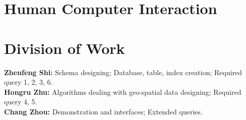 \documentclass[final,1p,times]{elsarticle}
\begin{document}
\section{Human Computer Interaction}

\section{Division of Work}
\textbf{Zhenfeng Shi:} Schema designing; Database, table, index creation; Required query 1, 2, 3, 6.\\

\textbf{Hongru Zhu:} Algorithms dealing with geo-spatial data designing; Required query 4, 5.\\

\textbf{Chang Zhou:} Demonstration and interfaces; Extended queries. 















\end{document}
